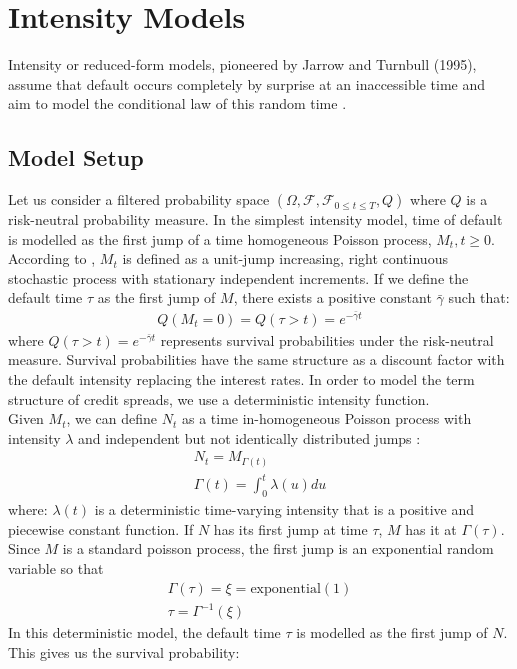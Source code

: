 \documentclass[11t,a4paper]{article}
\begin{document}
\section{Intensity Models}
Intensity or reduced-form models, pioneered by Jarrow and Turnbull (1995), assume that default occurs completely by surprise at an inaccessible time and aim to model the conditional law of this random time \cite{rf}. 
\subsection{Model Setup}
Let us consider a filtered probability space $(\Omega, \mathcal{F}, \mathcal{F}_{0\leq{t}\leq{T}}, Q)$ where $Q$ is a risk-neutral probability measure. In the simplest intensity model, time of default is modelled as the first jump of a time homogeneous Poisson process, ${M_t, t\geq 0}$. According to \cite{Brigobook}, $M_t$ is defined as a unit-jump increasing, right continuous stochastic process with stationary independent increments. If we define the default time $\tau$ as the first jump of $M$, there exists a positive constant $\bar{\gamma}$ such that:
\begin{align}Q(M_t=0)=Q(\tau> t)=e^{-\bar{\gamma}t}\end{align}
where $Q(\tau > t)=e^{-\bar{\gamma}t}$ represents survival probabilities under the risk-neutral measure. Survival probabilities have the same structure as a discount factor with the default intensity replacing the interest rates. In order to model the term structure of credit spreads, we use a deterministic intensity function.\\
Given $M_t$, we can define $N_t$ as a time in-homogeneous Poisson process with intensity $\lambda$ and independent but not identically distributed jumps \cite{intlecnotes}:
\begin{gather}
 N_t = M_{\Gamma(t)} \\
 \Gamma(t) = \int_{0}^{t}\lambda(u) du
 \end{gather}
where:
$\lambda(t)$ is a deterministic time-varying intensity that is a positive and piecewise constant function. 
If $N$ has its first jump at time $\tau$, $M$ has it at $\Gamma(\tau)$. 
Since $M$ is a standard poisson process, the first jump is an exponential random variable so that 
\begin{gather}
\Gamma(\tau) = \xi = \text{exponential}(1) \\
\tau = \Gamma^{-1}(\xi)
\end{gather}
In this deterministic model, the default time $\tau$ is modelled as the first jump of $N$. This gives us the survival probability:
\end{document}
